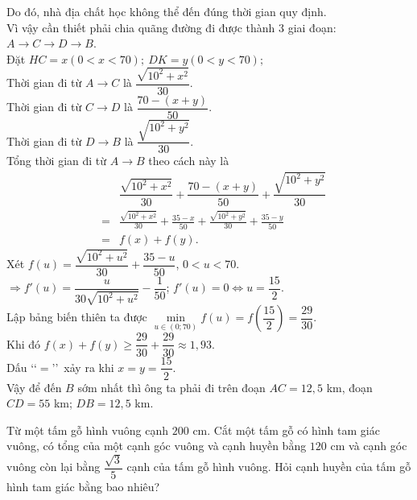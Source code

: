\begin{bt}
{		Do đó, nhà địa chất học không thể đến đúng thời gian quy định. \\
		Vì vậy cần thiết phải chia quãng đường đi được thành 3 giai đoạn:
		$A \to C \to D \to B$.  \\
		Đặt $HC = x (0 < x < 70);\  DK = y (0 < y < 70);$ \\ 
		Thời gian đi từ $A \to C$ là $\dfrac{\sqrt{10^2 + x^2}}{30}$. \\ 
		Thời gian đi từ $C \to D$ là $\dfrac{70 - (x + y)}{50}$. \\ 
		Thời gian đi từ $D \to B$ là $\dfrac{\sqrt{10^2 + y^2}}{30}$. \\
		Tổng thời gian đi từ $A \to B$ theo cách này là 
		\begin{eqnarray*}
			& & \dfrac{\sqrt{10^2 + x^2}}{30} + \dfrac{70-(x+y)}{50} + \dfrac{\sqrt{10^2 + y^2}}{30}\\
			&= & \frac{\sqrt{10^2 + x^2}}{30} + \frac{35-x}{50} + \frac{\sqrt{10^2 + y^2}}{30} + \frac{35-y}{50} \\
			&= & f(x) + f(y).
		\end{eqnarray*}
		Xét $f(u) = \dfrac{\sqrt{10^2 + u^2}}{30} + \dfrac{35-u}{50}$, $0 < u < 70$. \\
		$\Rightarrow f'(u) = \dfrac{u}{30\sqrt{10^2 + u^2}} - \dfrac{1}{50}$; $f'(u) = 0 \Leftrightarrow u = \dfrac{15}{2}$. \\
		Lập bảng biến thiên ta được $\min\limits_{u\in(0;70)} f(u) = f\left( \dfrac{15}{2}\right)  = \dfrac{29}{30}$. \\
		Khi đó $f(x) + f(y) \geq \dfrac{29}{30} + \dfrac{29}{30} \approx 1,93$. \\
		Dấu \lq\lq$=$\rq\rq \, xảy ra khi $x = y = \dfrac{15}{2}$.\\
		Vậy để đến $B$ sớm nhất thì ông ta phải đi trên đoạn $AC=12{,}5$ km, đoạn $CD = 55$ km; $DB = 12{,}5$ km.}
\end{bt}

\begin{bt}%

	Từ một tấm gỗ hình vuông cạnh $200$ cm. Cắt một tấm gỗ có hình tam giác vuông, có tổng của một cạnh góc vuông và cạnh huyền bằng $120$ cm và cạnh góc vuông còn lại bằng $\dfrac{\sqrt3}{5}$ cạnh của tấm gỗ hình vuông. Hỏi cạnh huyền của tấm gỗ hình tam giác bằng bao nhiêu?
\end{bt}


